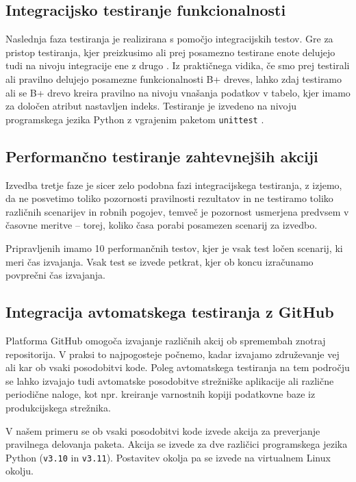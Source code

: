 \documentclass[a4paper,12pt,openright]{book}
\begin{document}
   \subsection{Integracijsko testiranje funkcionalnosti}

    Naslednja faza testiranja je realizirana s pomočjo integracijskih testov. Gre za pristop testiranja, kjer preizkusimo ali prej posamezno testirane enote delujejo tudi na nivoju integracije ene z drugo \cite{brar2015differentiating}. Iz praktičnega vidika, če smo prej testirali ali pravilno delujejo posamezne funkcionalnosti B+ dreves, lahko zdaj testiramo ali se B+ drevo kreira pravilno na nivoju vnašanja podatkov v tabelo, kjer imamo za določen atribut nastavljen indeks. Testiranje je izvedeno na nivoju programskega jezika Python z vgrajenim paketom {\tt unittest} \cite{PY_UNITTEST}.
   
   \subsection{Performančno testiranje zahtevnejših akciji}

    Izvedba tretje faze je sicer zelo podobna fazi integracijskega testiranja, z izjemo, da ne posvetimo toliko pozornosti pravilnosti rezultatov in ne testiramo toliko različnih scenarijev in robnih pogojev, temveč je pozornost usmerjena predvsem v časovne meritve – torej, koliko časa porabi posamezen scenarij za izvedbo.

    Pripravljenih imamo 10 performančnih testov, kjer je vsak test ločen scenarij, ki meri čas izvajanja. Vsak test se izvede petkrat, kjer ob koncu izračunamo povprečni čas izvajanja.
   
   \subsection{Integracija avtomatskega testiranja z GitHub}

   Platforma GitHub omogoča izvajanje različnih akcij ob spremembah znotraj repositorija. V praksi to najpogosteje počnemo, kadar izvajamo združevanje vej ali kar ob vsaki posodobitvi kode. Poleg avtomatskega testiranja na tem področju se lahko izvajajo tudi avtomatske posodobitve strežniške aplikacije ali različne periodične naloge, kot npr. kreiranje varnostnih kopiji podatkovne baze iz produkcijskega strežnika.

   V našem primeru se ob vsaki posodobitvi kode izvede akcija za preverjanje pravilnega delovanja paketa. Akcija se izvede za dve različici programskega jezika Python ({\tt v3.10} in {\tt v3.11}). Postavitev okolja pa se izvede na virtualnem Linux okolju.
\end{document}
